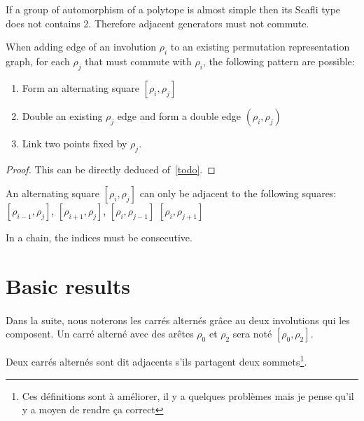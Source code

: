 \begin{proposition}
  \label{adjacent-must-not-commute}
  If a group of automorphism of a polytope is almost simple then its Scafli type does not contains 2. Therefore adjacent generators must not commute.
\end{proposition}

\begin{proposition}
  \label{patterns-adding}
  When adding edge of an involution $\rho_i$ to an existing permutation representation graph, for each $\rho_j$ that must commute with $\rho_i$, the following pattern are possible:
  \begin{enumerate}
    \item Form an alternating square $[\rho_i, \rho_j]$
    \item Double an existing $\rho_j$ edge and form a double edge $(\rho_i, \rho_j)$
    \item Link two points fixed by $\rho_j$.
  \end{enumerate}
\end{proposition}

\begin{proof}
  This can be directly deduced of~\ref{todo}.
\end{proof}

\begin{lemma}
  \label{adjacent-squares}
  An alternating square $[\rho_i, \rho_j]$ can only be adjacent to the following squares: $[\rho_{i-1}, \rho_j]$, $[\rho_{i+1}, \rho_j]$, $[\rho_i, \rho_{j-1}]$ $[\rho_i, \rho_{j+1}]$
\end{lemma}

\begin{lemma}
  \label{chain-consecutive}
  In a chain, the indices must be consecutive.
\end{lemma}



\section{Basic results}

\paragraph{}
Dans la suite, nous noterons les carrés alternés grâce au deux involutions qui les composent. Un carré alterné avec des arêtes $\rho_0$ et $\rho_2$ sera noté $[\rho_0, \rho_2]$.

\begin{definition}
  Deux carrés alternés sont dit adjacents s'ils partagent deux sommets\footnote{Ces définitions sont à améliorer, il y a quelques problèmes mais je pense qu'il y a moyen de rendre ça correct}.
\end{definition}

